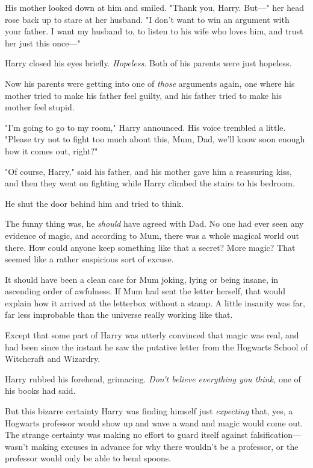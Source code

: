 His mother looked down at him and smiled. "Thank you, Harry. But\mbox{---}" her head
rose back up to stare at her husband. "I don't want to win an argument with
your father. I want my husband to, to listen to his wife who loves him, and
trust her just this once\mbox{---}"

Harry closed his eyes briefly. \emph{Hopeless.} Both of his parents were just
hopeless.

Now his parents were getting into one of \emph{those} arguments again, one
where his mother tried to make his father feel guilty, and his father tried to
make his mother feel stupid.

"I'm going to go to my room," Harry announced. His voice trembled a little.
"Please try not to fight too much about this, Mum, Dad, we'll know soon enough
how it comes out, right?"

"Of course, Harry," said his father, and his mother gave him a reassuring kiss,
and then they went on fighting while Harry climbed the stairs to his bedroom.

He shut the door behind him and tried to think.

The funny thing was, he \emph{should} have agreed with Dad. No one had ever
seen any evidence of magic, and according to Mum, there was a whole magical
world out there. How could anyone keep something like that a secret? More
magic? That seemed like a rather suspicious sort of excuse.

It should have been a clean case for Mum joking, lying or being insane, in
ascending order of awfulness. If Mum had sent the letter herself, that would
explain how it arrived at the letterbox without a stamp. A little insanity was
far, far less improbable than the universe really working like that.

Except that some part of Harry was utterly convinced that magic was real, and
had been since the instant he saw the putative letter from the Hogwarts School
of Witchcraft and Wizardry.

Harry rubbed his forehead, grimacing. \emph{Don't believe everything you
think,} one of his books had said.

But this bizarre certainty{\el} Harry was finding himself just
\emph{expecting} that, yes, a Hogwarts professor would show up and wave a wand
and magic would come out. The strange certainty was making no effort to guard
itself against falsification---wasn't making excuses in advance for why there
wouldn't be a professor, or the professor would only be able to bend spoons.


